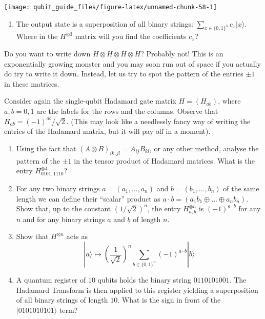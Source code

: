 \documentclass[fleqn,a4paper]{article}
\providecommand{\tightlist}{\setlength{\itemsep}{0pt}\setlength{\parskip}{0pt}}
\theoremstyle{definition}
\theoremstyle{definition}
\theoremstyle{definition}
\theoremstyle{definition}
\theoremstyle{remark}
\begin{document}
\begin{center}\texttt{[image: qubit\_guide\_files/figure-latex/unnamed-chunk-58-1]} \end{center}

\begin{enumerate}
\def\labelenumi{\arabic{enumi}.}
\tightlist
\item
  The output state is a superposition of all binary strings: \(\sum_{x\in\{0,1\}^3} c_x|x\rangle\).
  Where in the \(H^{\otimes 3}\) matrix will you find the coefficients \(c_x\)?
\end{enumerate}

Do you want to write down \(H\otimes H\otimes H\otimes H\)?
Probably not!
This is an exponentially growing monster and you may soon run out of space if you actually do try to write it down.
Instead, let us try to spot the pattern of the entries \(\pm1\) in these matrices.

Consider again the single-qubit Hadamard gate matrix \(H=(H_{ab})\), where \(a,b=0,1\) are the labels for the rows and the columns.
Observe that \(H_{ab}=(-1)^{ab}/\sqrt{2}\).
(This may look like a needlessly fancy way of writing the entries of the Hadamard matrix, but it will pay off in a moment).

\begin{enumerate}
\def\labelenumi{\arabic{enumi}.}
\setcounter{enumi}{1}
\item
  Using the fact that \((A\otimes B)_{ik,jl} = A_{ij}B_{kl}\), or any other method, analyse the pattern of the \(\pm1\) in the tensor product of Hadamard matrices.
  What is the entry \(H^{\otimes 4}_{0101,1110}\)?
\item
  For any two binary strings \(a=(a_1,\ldots, a_n)\) and \(b =(b_1,\ldots , b_n)\) of the same length we can define their ``scalar'' product as \(a\cdot b = (a_1b_1\oplus \ldots \oplus a_n b_n)\).
  Show that, up to the constant \((1/\sqrt{2})^n\), the entry \(H^{\otimes n}_{a,b}\) is \((-1)^{a\cdot b}\) for any \(n\) and for any binary strings \(a\) and \(b\) of length \(n\).
\item
  Show that \(H^{\otimes n}\) acts as
  \[
   |a\rangle
   \longmapsto
   \left(\frac{1}{\sqrt{2}}\right)^n
   \sum_{b\in\{0,1\}^n} (-1)^{a\cdot b}|b\rangle
    \]
\item
  A quantum register of \(10\) qubits holds the binary string \(0110101001\).
  The Hadamard Transform is then applied to this register yielding a superposition of all binary strings of length \(10\).
  What is the sign in front of the \(|0101010101\rangle\) term?
\end{enumerate}
\end{document}
